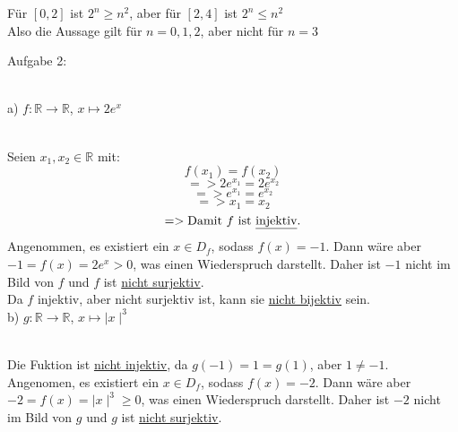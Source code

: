 \documentclass[11pt]{article}
\begin{document}
			Für $[0,2]$ ist $2^n \geq n^2$, aber für $[2,4]$ ist $2^n \leq n^2$\\
			Also die Aussage gilt für $n=0,1,2$, aber nicht für $n=3$\\
		\noindent \begin{Large}Aufgabe 2:\end{Large}\\[2pt]
			\indent a) $f: \mathbb{R} \rightarrow \mathbb{R}$, $x \mapsto 2e^x$\\
			\\
			Seien $x_1, x_2 \in \mathbb{R}$ mit:
				$$f(x_1)=f(x_2)$$
				$$=> 2e^{x_1}=2e^{x_2}$$
				$$=> e^{x_1}=e^{x_2}$$
				$$=>x_1=x_2$$
				$$=>\mbox{Damit }f \mbox{ ist \underline{injektiv}.}$$
				Angenommen, es existiert ein $x \in D_f$, sodass $f(x)=-1$. Dann wäre aber $-1=f(x)=2e^x>0$, was einen Wiederspruch darstellt. Daher ist $-1$ nicht im Bild von $f$ und $f$ ist \underline{nicht surjektiv}.\\
				Da $f$ injektiv, aber nicht surjektiv ist, kann sie \underline{nicht bijektiv} sein.\\
			\indent b) $g: \mathbb{R} \rightarrow \mathbb{R}$, $x \mapsto \mid x \mid ^3$\\
				\\
				Die Fuktion ist \underline{nicht injektiv}, da $g(-1)=1=g(1)$, aber $1 \neq -1$.\\
				Angenomen, es existiert ein $x \in D_f$, sodass $f(x)=-2$. Dann wäre aber $-2=f(x)= \mid x \mid ^3 \geq 0$, was einen Wiederspruch darstellt. Daher ist $-2$ nicht im Bild von $g$ und $g$ ist \underline{nicht surjektiv}.\\
\end{document}
